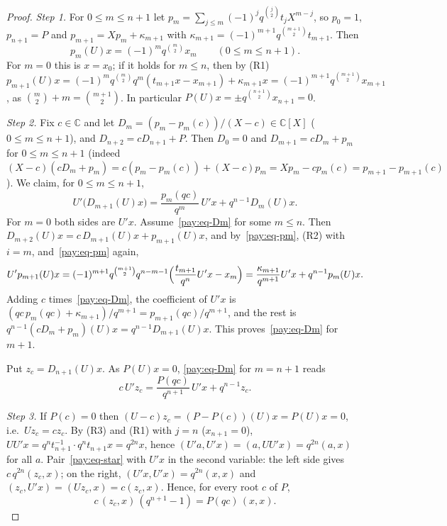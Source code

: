 \documentclass[10pt]{amsart}
\theoremstyle{definition}
\theoremstyle{remark}
\newcommand{\C}{\mathbb C}
\begin{document}
\begin{proof}
\emph{Step 1.} For $0\le m\le n+1$ let $p_m=\sum_{j\le m}(-1)^jq^{\binom j2}t_jX^{m-j}$, so $p_0=1$,
$p_{n+1}=P$ and $p_{m+1}=Xp_m+\kappa_{m+1}$ with $\kappa_{m+1}=(-1)^{m+1}q^{\binom{m+1}2}t_{m+1}$. Then
\begin{equation}\label{pay:eq-pm}
p_m(U)x=(-1)^mq^{\binom m2}x_m\qquad(0\le m\le n+1).
\end{equation}
For $m=0$ this is $x=x_0$; if it holds for $m\le n$, then by (R1)
$p_{m+1}(U)x=(-1)^mq^{\binom m2}q^m(t_{m+1}x-x_{m+1})+\kappa_{m+1}x=(-1)^{m+1}q^{\binom{m+1}2}x_{m+1}$,
as $\binom m2+m=\binom{m+1}2$. In particular $P(U)x=\pm q^{\binom{n+1}2}x_{n+1}=0$.

\emph{Step 2.} Fix $c\in\C$ and let $D_m=(p_m-p_m(c))/(X-c)\in\C[X]$ ($0\le m\le n+1$), and $D_{n+2}=
cD_{n+1}+P$. Then $D_0=0$ and $D_{m+1}=cD_m+p_m$ for $0\le m\le n+1$ (indeed $(X-c)(cD_m+p_m)=c(p_m-
p_m(c))+(X-c)p_m=Xp_m-cp_m(c)=p_{m+1}-p_{m+1}(c)$). We claim, for $0\le m\le n+1$,
\begin{equation}\label{pay:eq-Dm}
U'\bigl(D_{m+1}(U)x\bigr)=\frac{p_m(qc)}{q^m}\,U'x+q^{n-1}D_m(U)x .
\end{equation}
For $m=0$ both sides are $U'x$. Assume~\eqref{pay:eq-Dm} for some $m\le n$. Then $D_{m+2}(U)x=c\,
D_{m+1}(U)x+p_{m+1}(U)x$, and by~\eqref{pay:eq-pm}, (R2) with $i=m$, and~\eqref{pay:eq-pm} again,
\[
U'p_{m+1}(U)x=(-1)^{m+1}q^{\binom{m+1}2}q^{n-m-1}\Bigl(\frac{t_{m+1}}{q^n}U'x-x_m\Bigr)=
\frac{\kappa_{m+1}}{q^{m+1}}U'x+q^{n-1}p_m(U)x .
\]
Adding $c$ times~\eqref{pay:eq-Dm}, the coefficient of $U'x$ is $(qc\,p_m(qc)+\kappa_{m+1})/q^{m+1}=
p_{m+1}(qc)/q^{m+1}$, and the rest is $q^{n-1}(cD_m+p_m)(U)x=q^{n-1}D_{m+1}(U)x$. This
proves~\eqref{pay:eq-Dm} for $m+1$.

Put $z_c=D_{n+1}(U)x$. As $P(U)x=0$, \eqref{pay:eq-Dm} for $m=n+1$ reads
\begin{equation}\label{pay:eq-star}
c\,U'z_c=\frac{P(qc)}{q^{n+1}}\,U'x+q^{n-1}z_c .
\end{equation}

\emph{Step 3.} If $P(c)=0$ then $(U-c)z_c=(P-P(c))(U)x=P(U)x=0$, i.e.\ $Uz_c=cz_c$. By (R3) and (R1)
with $j=n$ ($x_{n+1}=0$), $UU'x=q^nt_{n+1}^{-1}\cdot q^nt_{n+1}x=q^{2n}x$, hence
$(U'a,U'x)=(a,UU'x)=q^{2n}(a,x)$ for all $a$. Pair~\eqref{pay:eq-star} with $U'x$ in the second
variable: the left side gives $c\,q^{2n}(z_c,x)$; on the right, $(U'x,U'x)=q^{2n}(x,x)$ and $(z_c,U'x)=
(Uz_c,x)=c(z_c,x)$. Hence, for every root $c$ of $P$,
\begin{equation}\label{pay:eq-E}
c\,(z_c,x)\,(q^{n+1}-1)=P(qc)\,(x,x).
\end{equation}


\end{proof}
\end{document}
